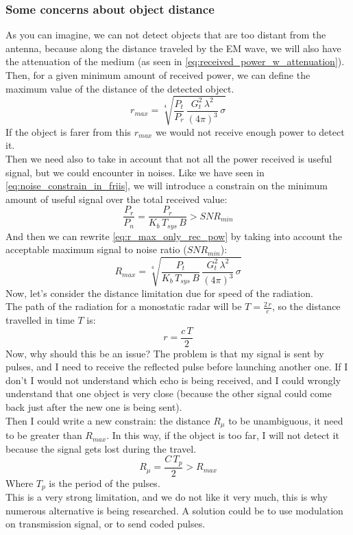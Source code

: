 \subsubsection*{Some concerns about object distance}
As you can imagine, we can not detect objects that are too distant from the antenna, because along the distance traveled by the EM wave, we will also have the attenuation of the medium (as seen in \cref{eq:received_power_w_attenuation}).\\
Then, for a given minimum amount of received power, we can define the maximum value of the distance of the detected object. 
\begin{equation}\label{eq:r_max_only_rec_pow}
    r_{max}=\sqrt[4]{\frac{P_t}{P_r}\,\frac{G_t^2\,\lambda^2}{(4\pi)^3}\,\sigma}
\end{equation}
If the object is farer from this $r_{max}$ we would not receive enough power to detect it.\\
Then we need also to take in account that not all the power received is useful signal, but we could encounter in noises. Like we have seen in \cref{eq:noise_constrain_in_friis}, we will introduce a constrain on the minimum amount of useful signal over the total received value:
\begin{equation}
    \frac{P_r}{P_n}=\frac{P_r}{K_b\,T_{sys}\,B}>SNR_{min}
\end{equation}
And then we can rewrite \cref{eq:r_max_only_rec_pow} by taking into account the acceptable maximum signal to noise ratio ($SNR_{min}$):
\begin{equation}
    R_{max}=\sqrt[4]{\frac{P_t}{K_b\,T_{sys}\,B}\,\frac{G_t^2\,\lambda^2}{(4\pi)^3}\,\sigma}
\end{equation}
Now, let's consider the distance limitation due for speed of the radiation.\\
The path of the radiation for a monostatic radar will be $T=\frac{2\,r}{c}$, so the distance travelled in time $T$ is:
\begin{equation}
    r=\frac{c\,T}{2}
\end{equation}
Now, why should this be an issue? The problem is that my signal is sent by pulses, and I need to receive the reflected pulse before launching another one. If I don't I would not understand which echo is being received, and I could wrongly understand that one object is very close (because the other signal could come back just after the new one is being sent).\\
Then I could write a new constrain: the distance $R_\mu$ to be unambiguous, it need to be greater than $R_{max}$. In this way, if the object is too far, I will not detect it because the signal gets lost during the travel.
\begin{equation}
    R_\mu=\frac{C\,T_p}{2}>R_{max}
\end{equation}
Where $T_p$ is the period of the pulses.\\
This is a very strong limitation, and we do not like it very much, this is why numerous alternative is being researched. A solution could be to use modulation on transmission signal, or to send coded pulses.
